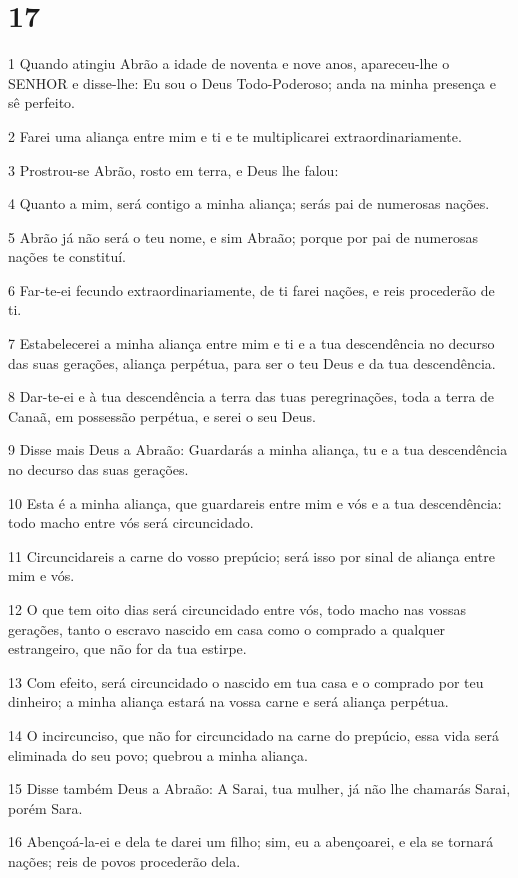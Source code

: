 \chapter{17}

\par 1 Quando atingiu Abrão a idade de noventa e nove anos, apareceu-lhe o SENHOR e disse-lhe: Eu sou o Deus Todo-Poderoso; anda na minha presença e sê perfeito.
\par 2 Farei uma aliança entre mim e ti e te multiplicarei extraordinariamente.
\par 3 Prostrou-se Abrão, rosto em terra, e Deus lhe falou:
\par 4 Quanto a mim, será contigo a minha aliança; serás pai de numerosas nações.
\par 5 Abrão já não será o teu nome, e sim Abraão; porque por pai de numerosas nações te constituí.
\par 6 Far-te-ei fecundo extraordinariamente, de ti farei nações, e reis procederão de ti.
\par 7 Estabelecerei a minha aliança entre mim e ti e a tua descendência no decurso das suas gerações, aliança perpétua, para ser o teu Deus e da tua descendência.
\par 8 Dar-te-ei e à tua descendência a terra das tuas peregrinações, toda a terra de Canaã, em possessão perpétua, e serei o seu Deus.
\par 9 Disse mais Deus a Abraão: Guardarás a minha aliança, tu e a tua descendência no decurso das suas gerações.
\par 10 Esta é a minha aliança, que guardareis entre mim e vós e a tua descendência: todo macho entre vós será circuncidado.
\par 11 Circuncidareis a carne do vosso prepúcio; será isso por sinal de aliança entre mim e vós.
\par 12 O que tem oito dias será circuncidado entre vós, todo macho nas vossas gerações, tanto o escravo nascido em casa como o comprado a qualquer estrangeiro, que não for da tua estirpe.
\par 13 Com efeito, será circuncidado o nascido em tua casa e o comprado por teu dinheiro; a minha aliança estará na vossa carne e será aliança perpétua.
\par 14 O incircunciso, que não for circuncidado na carne do prepúcio, essa vida será eliminada do seu povo; quebrou a minha aliança.
\par 15 Disse também Deus a Abraão: A Sarai, tua mulher, já não lhe chamarás Sarai, porém Sara.
\par 16 Abençoá-la-ei e dela te darei um filho; sim, eu a abençoarei, e ela se tornará nações; reis de povos procederão dela.
